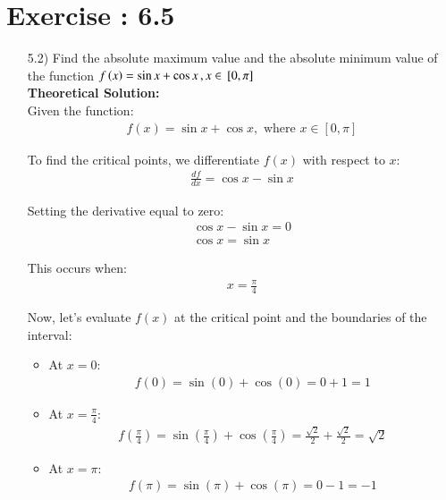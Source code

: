 \documentclass[journal]{IEEEtran}
\begin{document}
\section*{Exercise : 6.5}
\begin{enumerate}
\item [5.2)] Find the absolute maximum value and the absolute minimum value of the function $f\left(x\right) = \sin{x} + \cos{x} \,, x \in {}\left[0, \pi\right]$\\
\textbf{Theoretical Solution:}\\
Given the function:
\begin{align}
    f(x) = \sin x + \cos x, \text{ where } x \in [0, \pi]
\end{align}

To find the critical points, we differentiate $f(x)$ with respect to $x$:
\begin{align}
    \frac{df}{dx} = \cos x - \sin x
\end{align}

Setting the derivative equal to zero:
\begin{align}
    \cos x - \sin x = 0 \\
    \cos x = \sin x
\end{align}

This occurs when:
\begin{align}
    x = \frac{\pi}{4}
\end{align}

Now, let's evaluate $f(x)$ at the critical point and the boundaries of the interval:

\begin{itemize}
    \item At $x = 0$:
    \begin{align}
        f(0) = \sin(0) + \cos(0) = 0 + 1 = 1
    \end{align}
    
    \item At $x = \frac{\pi}{4}$:
    \begin{align}
        f\left(\frac{\pi}{4}\right) = \sin\left(\frac{\pi}{4}\right) + \cos\left(\frac{\pi}{4}\right) = \frac{\sqrt{2}}{2} + \frac{\sqrt{2}}{2} = \sqrt{2}
    \end{align}
    
    \item At $x = \pi$:
    \begin{align}
        f(\pi) = \sin(\pi) + \cos(\pi) = 0 - 1 = -1
    \end{align}
\end{itemize}


\end{enumerate}
\end{document}
